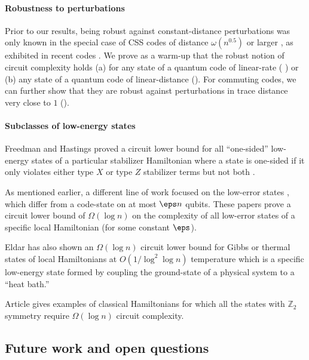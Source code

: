 \documentclass{toc}
\begin{document}
\paragraph{Robustness to perturbations}

Prior to our results, being robust %
against  %
constant-distance perturbations was only known in the special case of CSS codes of distance $\omega(n^{0.5})$ or larger \cite{8104078}, as exhibited in recent codes \cite{hastings2020fiber, panteleev2020quantum} . We prove as a warm-up that the robust notion of circuit complexity holds (a) for any state of a quantum code of linear-rate ( ) or (b) any state of a quantum code of linear-distance (). For commuting codes, we can further show that they are
robust %
against  %
perturbations in trace distance very close to $1$ ().

\paragraph{Subclasses of low-energy states}
Freedman and Hastings proved a circuit lower bound for all ``one-sided'' low-energy states of a particular stabilizer Hamiltonian where a state is one-sided if it only violates either type $X$ or type $Z$ stabilizer terms but not both \cite{10.5555/2600498.2600507}. 

As mentioned earlier, a different line of work focused on the low-error states \cite{8104078}, which differ from a code-state on at most $\eps n$ qubits. These %
papers  %
prove a circuit lower bound of $\Omega(\log n)$ on the complexity of all low-error states of a specific local Hamiltonian \cite{8104078,nirkhe_et_al:LIPIcs:2018:9095} (for some constant $\eps$).

Eldar has also shown
%
an  %
$\Omega(\log n)$ circuit lower bound
%
for Gibbs or thermal states of local Hamiltonians at $O(1/\log^2 \log n)$ temperature \cite{Eldar2019RobustQE} which is a specific low-energy state formed by coupling the ground-state of a physical system to a ``heat bath.''

Article   %
\cite{BravyiKKT19} %
%
gives  %
examples of classical Hamiltonians for which all the states with $\mathbb{Z}_2$ symmetry require $\Omega(\log n)$ circuit complexity. 

\subsection{Future work and open questions}
\end{document}
